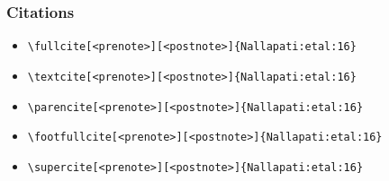 \begin{frame}[fragile]
  \frametitle{Citations}


\begin{itemize}
\item \verb|\fullcite[<prenote>][<postnote>]{Nallapati:etal:16}| \newline  {}
\item \verb|\textcite[<prenote>][<postnote>]{Nallapati:etal:16}| \newline \textcite[<prenote>][<postnote>]{Nallapati:etal:16}
\item \verb|\parencite[<prenote>][<postnote>]{Nallapati:etal:16}| \newline \parencite[<prenote>][<postnote>]{Nallapati:etal:16}
\item \verb|\footfullcite[<prenote>][<postnote>]{Nallapati:etal:16}| \newline  {}
\item \verb|\supercite[<prenote>][<postnote>]{Nallapati:etal:16}| \newline \supercite[<prenote>][<postnote>]{Nallapati:etal:16}

\end{itemize}
\end{frame}
